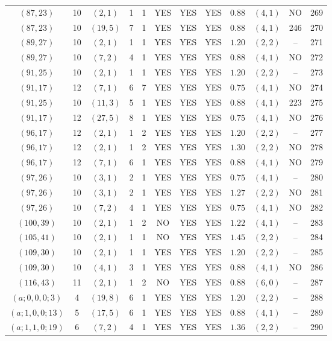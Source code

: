 \begin{longtable}{|c|c|c|c|c|c|c|c|c|c|c|c|}
$(87,23)$ & 10 & $(2,1)$ & 1 & 1 & YES & YES & YES & $0.88$ & $(4,1)$ & NO & 269\\
$(87,23)$ & 10 & $(19,5)$ & 7 & 1 & YES & YES & YES & $0.88$ & $(4,1)$ & 246 & 270\\
$(89,27)$ & 10 & $(2,1)$ & 1 & 1 & YES & YES & YES & $1.20$ & $(2,2)$ & -- & 271\\
$(89,27)$ & 10 & $(7,2)$ & 4 & 1 & YES & YES & YES & $0.88$ & $(4,1)$ & NO & 272\\
$(91,25)$ & 10 & $(2,1)$ & 1 & 1 & YES & YES & YES & $1.20$ & $(2,2)$ & -- & 273\\
$(91,17)$ & 12 & $(7,1)$ & 6 & 7 & YES & YES & YES & $0.75$ & $(4,1)$ & NO & 274\\
$(91,25)$ & 10 & $(11,3)$ & 5 & 1 & YES & YES & YES & $0.88$ & $(4,1)$ & 223 & 275\\
$(91,17)$ & 12 & $(27,5)$ & 8 & 1 & YES & YES & YES & $0.75$ & $(4,1)$ & NO & 276\\
$(96,17)$ & 12 & $(2,1)$ & 1 & 2 & YES & YES & YES & $1.20$ & $(2,2)$ & -- & 277\\
$(96,17)$ & 12 & $(2,1)$ & 1 & 2 & YES & YES & YES & $1.30$ & $(2,2)$ & NO & 278\\
$(96,17)$ & 12 & $(7,1)$ & 6 & 1 & YES & YES & YES & $0.88$ & $(4,1)$ & NO & 279\\
$(97,26)$ & 10 & $(3,1)$ & 2 & 1 & YES & YES & YES & $0.75$ & $(4,1)$ & -- & 280\\
$(97,26)$ & 10 & $(3,1)$ & 2 & 1 & YES & YES & YES & $1.27$ & $(2,2)$ & NO & 281\\
$(97,26)$ & 10 & $(7,2)$ & 4 & 1 & YES & YES & YES & $0.75$ & $(4,1)$ & NO & 282\\
$(100,39)$ & 10 & $(2,1)$ & 1 & 2 & NO & YES & YES & $1.22$ & $(4,1)$ & -- & 283\\
$(105,41)$ & 10 & $(2,1)$ & 1 & 1 & NO & YES & YES & $1.45$ & $(2,2)$ & -- & 284\\
$(109,30)$ & 10 & $(2,1)$ & 1 & 1 & YES & YES & YES & $1.20$ & $(2,2)$ & -- & 285\\
$(109,30)$ & 10 & $(4,1)$ & 3 & 1 & YES & YES & YES & $0.88$ & $(4,1)$ & NO & 286\\
$(116,43)$ & 11 & $(2,1)$ & 1 & 2 & NO & YES & YES & $0.88$ & $(6,0)$ & -- & 287\\
$(a;0,0,0;3)$ & 4 & $(19,8)$ & 6 & 1 & YES & YES & YES & $1.20$ & $(2,2)$ & -- & 288\\
$(a;1,0,0;13)$ & 5 & $(17,5)$ & 6 & 1 & YES & YES & YES & $0.88$ & $(4,1)$ & -- & 289\\
$(a;1,1,0;19)$ & 6 & $(7,2)$ & 4 & 1 & YES & YES & YES & $1.36$ & $(2,2)$ & -- & 290\\

\end{longtable}
